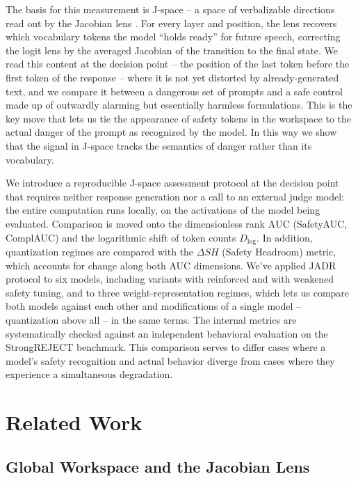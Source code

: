 \documentclass[10pt,twocolumn]{article}
\newcommand{\AUC}{\mathrm{AUC}}
\newcommand{\Dlog}{D_{\log}}
\begin{document}
The basis for this measurement is J-space -- a space of verbalizable directions read out by the Jacobian lens \citep{gurnee2026workspace}. For every layer and position, the lens recovers which vocabulary tokens the model ``holds ready'' for future speech, correcting the logit lens by the averaged Jacobian of the transition to the final state. We read this content at the decision point -- the position of the last token before the first token of the response -- where it is not yet distorted by already-generated text, and we compare it between a dangerous set of prompts and a safe control made up of outwardly alarming but essentially harmless formulations. This is the key move that lets us tie the appearance of safety tokens in the workspace to the actual danger of the prompt as recognized by the model. In this way we show that the signal in J-space tracks the semantics of danger rather than its vocabulary.

We introduce a reproducible J-space assessment protocol at the decision point that requires neither response generation nor a call to an external judge model: the entire computation runs locally, on the activations of the model being evaluated. Comparison is moved onto the dimensionless rank $\AUC$ (SafetyAUC, ComplAUC) and the logarithmic shift of token counts $\Dlog$. In addition, quantization regimes are compared with the $\Delta SH$ (Safety Headroom) metric, which accounts for change along both AUC dimensions. We've applied JADR protocol to six models, including variants with reinforced and with weakened safety tuning, and to three weight-representation regimes, which lets us compare both models against each other and modifications of a single model -- quantization above all -- in the same terms. The internal metrics are systematically checked against an independent behavioral evaluation on the StrongREJECT benchmark. This comparison serves to differ cases where a model's safety recognition and actual behavior diverge from cases where they experience a simultaneous degradation.

\section{Related Work}
\label{sec:related}

\subsection{Global Workspace and the Jacobian Lens}
\end{document}
